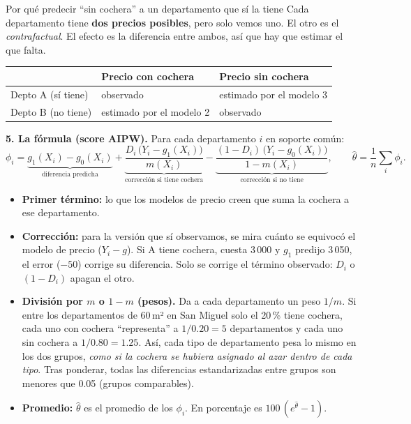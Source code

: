 \documentclass[10pt,a4paper]{article}
\begin{document}
\begin{caja}{Por qué predecir ``sin cochera'' a un departamento que sí la tiene}
Cada departamento tiene \textbf{dos precios posibles}, pero solo vemos uno. El otro es el \emph{contrafactual}. El efecto es la diferencia entre ambos, así que hay que estimar el que falta.\\[2pt]
\begin{tabularx}{\linewidth}{lXX}
\toprule
& Precio con cochera & Precio sin cochera \\\midrule
Depto A (sí tiene) & observado & estimado por el modelo 3 \\
Depto B (no tiene) & estimado por el modelo 2 & observado \\\bottomrule
\end{tabularx}
\end{caja}

\textbf{5. La fórmula (score AIPW).} Para cada departamento $i$ en soporte común:
\[
\phi_i=\underbrace{g_1(X_i)-g_0(X_i)}_{\text{diferencia predicha}}
+\underbrace{\frac{D_i\,\big(Y_i-g_1(X_i)\big)}{m(X_i)}}_{\text{corrección si tiene cochera}}
-\underbrace{\frac{(1-D_i)\,\big(Y_i-g_0(X_i)\big)}{1-m(X_i)}}_{\text{corrección si no tiene}},
\qquad
\hat\theta=\frac{1}{n}\sum_{i}\phi_i .
\]
\begin{itemize}
\item \textbf{Primer término:} lo que los modelos de precio creen que suma la cochera a ese departamento.
\item \textbf{Corrección:} para la versión que sí observamos, se mira cuánto se equivocó el modelo de precio ($Y_i-g$). Si A tiene cochera, cuesta 3\,000 y $g_1$ predijo 3\,050, el error ($-50$) corrige su diferencia. Solo se corrige el término observado: $D_i$ o $(1-D_i)$ apagan el otro.
\item \textbf{División por $m$ o $1-m$ (pesos).} Da a cada departamento un peso $1/m$. Si entre los departamentos de 60\,m² en San Miguel solo el 20\,\% tiene cochera, cada uno con cochera ``representa'' a $1/0.20=5$ departamentos y cada uno sin cochera a $1/0.80=1.25$. Así, cada tipo de departamento pesa lo mismo en los dos grupos, \emph{como si la cochera se hubiera asignado al azar dentro de cada tipo}. Tras ponderar, todas las diferencias estandarizadas entre grupos son menores que 0.05 (grupos comparables).
\item \textbf{Promedio:} $\hat\theta$ es el promedio de los $\phi_i$. En porcentaje es $100\,(e^{\hat\theta}-1)$.
\end{itemize}
\end{document}
